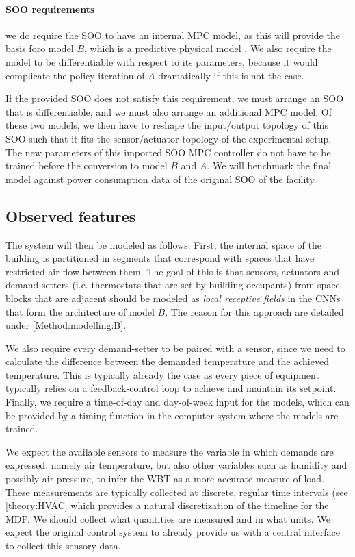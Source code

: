 \documentclass{article}
\theoremstyle{definition}
\theoremstyle{remark}
\begin{document}
\paragraph{SOO requirements} we do require the SOO to have an internal MPC model, as this will provide the basis foro model $B$, which is a predictive physical model . We also require the model to be differentiable with respect to its parameters, because it would complicate the policy iteration of $A$ dramatically if this is not the case.

If the provided SOO does not satisfy this requirement, we must arrange an SOO that is differentiable, and we must also arrange an additional MPC model. Of these two models, we then have to reshape the input/output topology of this SOO such that it fits the sensor/actuator topology of the experimental setup. The new parameters of this imported SOO MPC controller do not have to be trained before the conversion to model $B$ and $A$. We will benchmark the final model against power consumption data of the original SOO of the facility.

\subsection{Observed features}\label{Method:FeatureSel}

The system will then be modeled as follows:
First, the internal space of the building is partitioned in segments that correspond with spaces that have restricted air flow between them. The goal of this is that sensors, actuators and demand-setters (i.e. thermostats that are set by building occupants) from space blocks that are adjacent should be modeled as \textit{local receptive fields} in the CNNs that form the architecture of model $B$. The reason for this approach are detailed under \ref{Method:modelling:B}. 

We also require every demand-setter to be paired with a sensor, since we need to calculate the difference between the demanded temperature and the achieved temperature. This is typically already the case as every piece of equipment typically relies on a feedback-control loop to achieve and maintain its setpoint. Finally, we require a time-of-day and day-of-week input for the models, which can be provided by a timing function in the computer system where the models are trained.

We expect the available sensors to measure the variable in which demands are expressed, namely air temperature, but also other variables such as humidity and possibly air pressure, to infer the WBT as a more accurate measure of load. These measurements are typically collected at discrete, regular time intervals (see \ref{theory:HVAC} which provides a natural discretization of the timeline for the MDP. We should collect what quantities are measured and in what units. We expect the original control system to already provide us with a central interface to collect this sensory data.
\end{document}
